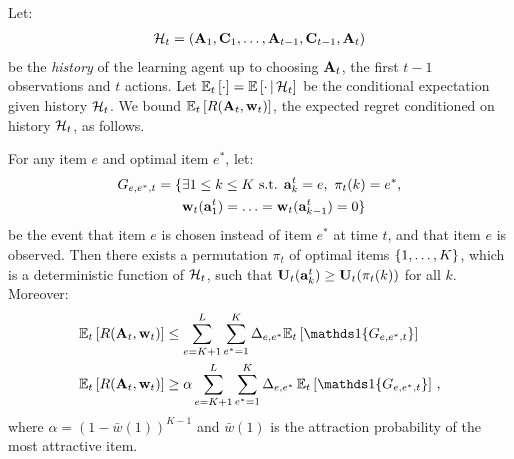 Let:
\begin{align}
  \mathcal{H}_t = (\mathbf{A}_1, \mathbf{C}_1, \dots, \mathbf{A}_{t - 1}, \mathbf{C}_{t - 1}, \mathbf{A}_t)
  \label{eq:history}
\end{align}
be the \emph{history} of the learning agent up to choosing $\mathbf{A}_t$, the first $t - 1$ observations and $t$ actions. Let $\mathbb{E}_t \left[\cdot\right] = \mathbb{E} \left[\cdot \,\middle|\, \mathcal{H}_t\right]$ be the conditional expectation given history $\mathcal{H}_t$. We bound $\mathbb{E}_t \left[R(\mathbf{A}_t, \mathbf{w}_t)\right]$, the expected regret conditioned on history $\mathcal{H}_t$, as follows.

\begin{theorem}
\label{thm:regret decomposition} For any item $e$ and optimal item $e^\ast$, let:
\begin{align}
  G_{e, e^\ast, t} & = \{\exists 1 \leq k \leq K \text{ s.t. } \rnd{a}^t_k = e, \ \pi_t(k) = e^\ast,
  \label{eq:counted event} \\
  & \phantom{{} = \{} \rnd{w}_t(\rnd{a}^t_1) = \ldots = \rnd{w}_t(\rnd{a}^t_{k - 1}) = 0\} \nonumber
\end{align}
be the event that item $e$ is chosen instead of item $e^\ast$ at time $t$, and that item $e$ is observed. Then there exists a permutation $\pi_t$ of optimal items $\left\{1, \dots, K\right\}$, which is a deterministic function of $\mathcal{H}_t$, such that $\mathbf{U}_t(\mathbf{a}^t_k) \geq \mathbf{U}_t(\pi_t(k))$ for all $k$. Moreover:
\begin{align*}
  \EEt{R(\rnd{A}_t, \rnd{w}_t)} & \leq
  \sum_{e = K + 1}^L \sum_{e^\ast = 1}^K \Delta_{e, e^\ast} \EEt{\I{G_{e, e^\ast, t}}} \\
  \EEt{R(\rnd{A}_t, \rnd{w}_t)} & \geq
  \alpha \sum_{e = K + 1}^L \sum_{e^\ast = 1}^K \Delta_{e, e^\ast} \,\EEt{\I{G_{e, e^\ast, t}}}\,,
\end{align*}
where $\alpha = (1 - \bar{w}(1))^{K - 1}$ and $\bar{w}(1)$ is the attraction probability of the most attractive item.
\end{theorem}
